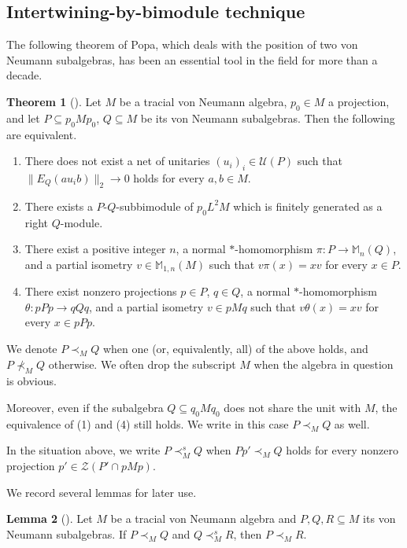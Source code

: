 \documentclass{amsart}
\theoremstyle{definition}
\newtheorem{theorem}{Theorem}[section]
\newtheorem{lemma}[theorem]{Lemma}
\renewcommand{\subset}{\subseteq}
\newcommand{\Mat}{\mathbb{M}}
\begin{document}
\subsection{Intertwining-by-bimodule technique}

The following theorem of Popa, which deals with the position of two von Neumann subalgebras, has been an essential tool in the field for more than a decade. 

\begin{theorem}[\cite{pop3, pop1}]
Let $M$ be a tracial von Neumann algebra, $p_0\in M$ a projection, and let $P\subset p_0Mp_0$, $Q\subset M$ be its von Neumann subalgebras. 
Then the following are equivalent. 
\begin{enumerate}
\item There does not exist a net of unitaries $(u_i)_i\in \mathcal{U}(P)$ such that $\| E_Q(au_ib) \|_2 \to 0$ holds for every $a,b\in M$. 
\item There exists a $P$-$Q$-subbimodule of $p_0L^2M$ which is finitely generated as a right $Q$-module. 
\item There exist a positive integer $n$, a normal $\ast$-homomorphism $\pi : P\to \Mat_n(Q)$, and a partial isometry $v\in \Mat_{1,n}(M)$ such that 
$v\pi(x)=xv$ for every $x\in P$. 
\item There exist nonzero projections $p\in P$, $q\in Q$, a normal $\ast$-homomorphism $\theta:pPp\to qQq$, and a partial isometry $v\in pMq$ such that $v\theta(x)=xv$ for every $x\in pPp$.
\end{enumerate}

We denote $P\prec_M Q$ when one (or, equivalently, all) of the above holds, and $P\nprec_M Q$ otherwise. 
We often drop the subscript $M$ when the algebra in question is obvious. 

Moreover, even if the subalgebra $Q\subset q_0Mq_0$ does not share the unit with $M$, 
the equivalence of (1) and (4) still holds. We write in this case $P\prec_M Q$ as well. 

\end{theorem}
In the situation above, we write $P\prec_M^s Q$ when $Pp'\prec_M Q$ holds for every nonzero projection $p'\in \mathcal{Z}(P'\cap pMp)$. 

We record several lemmas for later use. 

\begin{lemma}[\textup{\cite[Lemma 3.7]{vaes}}]
Let $M$ be a tracial von Neumann algebra and $P, Q, R\subset M$ its von Neumann subalgebras. If $P\prec_M Q$ and $Q\prec_M^s R$, then $P\prec_M R$. 
\end{lemma}
\end{document}
